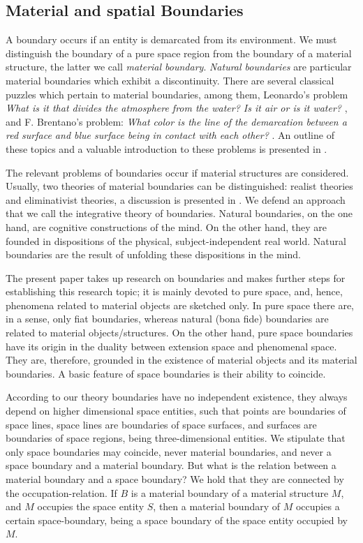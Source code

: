 \documentclass{ao2e}
\begin{document}
{ 
\subsection{Material and spatial Boundaries}
A boundary occurs if an entity is demarcated from its environment. We must distinguish the boundary of a pure space region from the boundary of a material structure, the latter we call {\it material boundary}. 
{\it Natural boundaries} are particular material boundaries which exhibit a discontinuity. There are several classical puzzles which pertain to material boundaries, among them, Leonardo's problem {\it What is it that divides the atmosphere from the water? Is it air or is it water?} \cite{leonardo-v-1938-a}, and F. Brentano's problem: {\it What color is the line of the demarcation between a red surface and blue surface being in contact with each other?} \cite{brentano-f-1976-a}. An outline of these topics and a valuable introduction to these problems is presented in \cite{varzi-ac-2008-a}.

The relevant problems of boundaries occur if
material structures are considered. Usually, two theories of material boundaries can be distinguished: realist theories and eliminativist theories, a discussion is presented in \cite{varzi-ac-1997-a}. We defend an approach that we call the integrative theory of boundaries. 
Natural boundaries, on the one hand, are cognitive constructions of the mind. On the other hand, they are
founded in dispositions of the physical, subject-independent real world. Natural boundaries are the result of unfolding these dispositions in the mind.

The present paper takes up research on boundaries and makes further steps for establishing this research topic; it is mainly devoted to pure space, and, hence, phenomena related to material objects are sketched only. In pure space there are, in a sense, only fiat boundaries, whereas natural (bona fide) boundaries are related to material objects/structures.
On the other hand, pure space boundaries have its origin in the duality between extension space and phenomenal space. They are, therefore, grounded in the existence of material objects and its material boundaries.
A basic feature of space boundaries is their ability to coincide.

 According to our theory boundaries have no independent existence, they always depend on higher dimensional space entities, such that points are boundaries of space lines, space lines are boundaries of space surfaces, and surfaces are boundaries of space regions, being three-dimensional entities. We stipulate that only space boundaries may coincide, never material boundaries, and never a space boundary and a material boundary. But what is the relation between a material boundary and a space boundary? We hold that they are connected by the occupation-relation. If $B$ is a material boundary of a material structure $M$, and $M$ occupies the space entity $S$, then a material boundary of $M$ occupies a certain space-boundary, being a space boundary of the space entity occupied by $M$.

}
\end{document}
